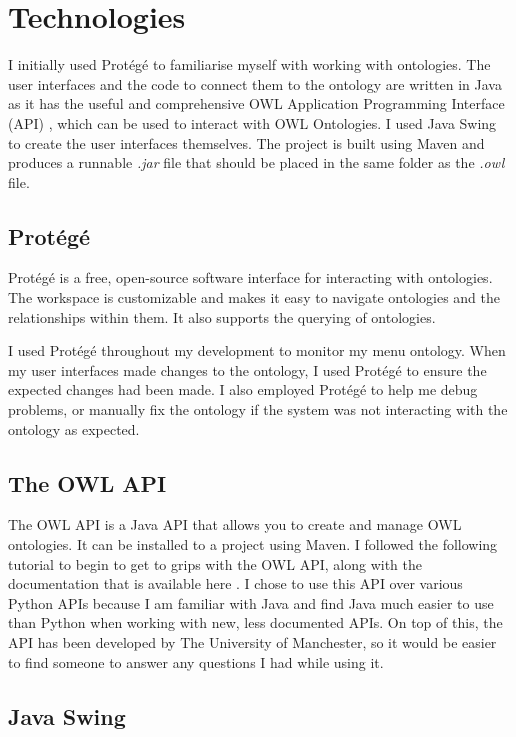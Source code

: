 \section{Technologies}

I initially used Protégé to familiarise myself with working with ontologies. The user interfaces and the code to connect them to the ontology are written in Java as it has the useful and comprehensive OWL Application Programming Interface (API) \cite{owl_api}, which can be used to interact with OWL Ontologies. I used Java Swing to create the user interfaces themselves. The project is built using Maven and produces a runnable \textit{.jar} file that should be placed in the same folder as the \textit{.owl} file.

\subsection{Protégé}

Protégé \cite{protege_2023} is a free, open-source software interface for interacting with ontologies. The workspace is customizable and makes it easy to navigate ontologies and the relationships within them. It also supports the querying of ontologies.

I used Protégé throughout my development to monitor my menu ontology. When my user interfaces made changes to the ontology, I used Protégé to ensure the expected changes had been made. I also employed Protégé to help me debug problems, or manually fix the ontology if the system was not interacting with the ontology as expected.

\subsection{The OWL API}

The OWL API is a Java API that allows you to create and manage OWL ontologies. It can be installed to a project using Maven. I followed the following tutorial \cite{matenzoglu_palmisano_2016} to begin to get to grips with the OWL API, along with the documentation that is available here \cite{owl_api_doc_2023}. I chose to use this API over various Python APIs because I am familiar with Java and find Java much easier to use than Python when working with new, less documented APIs. On top of this, the API has been developed by The University of Manchester, so it would be easier to find someone to answer any questions I had while using it.

\subsection{Java Swing}

